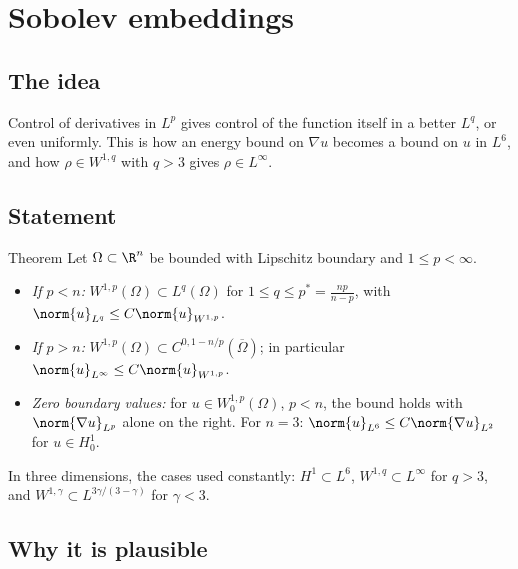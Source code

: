 
\section{Sobolev embeddings}\label{p:sobolev-embedding}


\subsection*{The idea}

Control of derivatives in $L^p$ gives control of the function itself in a better $L^q$, or even uniformly. This is how an energy bound on $\nabla u$ becomes a bound on $u$ in $L^6$, and how $\rho \in W^{1,q}$ with $q > 3$ gives $\rho \in L^\infty$.

\subsection*{Statement}

\begin{thmbox}{Theorem}
Let $\Omega\subset\R^n$ be bounded with Lipschitz boundary and $1\le p < \infty$.

\begin{itemize}
\item \emph{If $p < n$:} $W^{1,p}(\Omega)\subset L^{q}(\Omega)$ for $1 \le q \le p^* = \frac{np}{n-p}$, with $\norm{u}_{L^{q}} \le C\norm{u}_{W^{1,p}}$.
\item \emph{If $p > n$:} $W^{1,p}(\Omega)\subset C^{0,1-n/p}(\overline\Omega)$; in particular $\norm{u}_{L^\infty}\le C\norm{u}_{W^{1,p}}$.
\item \emph{Zero boundary values:} for $u\in W^{1,p}_0(\Omega)$, $p < n$, the bound holds with $\norm{\nabla u}_{L^p}$ alone on the right. For $n=3$: $\norm{u}_{L^6}\le C\norm{\nabla u}_{L^2}$ for $u\in H^1_0$.
\end{itemize}
\end{thmbox}

In three dimensions, the cases used constantly: $H^1\subset L^6$, $W^{1,q}\subset L^\infty$ for $q> 3$, and $W^{1,\gamma}\subset L^{3\gamma/(3-\gamma)}$ for $\gamma< 3$.

\subsection*{Why it is plausible}

